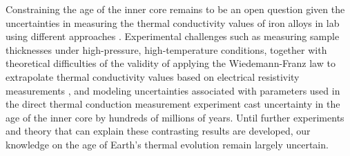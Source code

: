 \documentclass[9pt,twocolumn,twoside,lineno]{pnas-new}
\begin{document}


Constraining the age of the inner core remains to be an open question given the uncertainties in measuring the thermal conductivity values of iron alloys in lab using different approaches \cite{Konopkova2016a, Ohta2016a}. Experimental challenges such as measuring sample thicknesses under high-pressure, high-temperature conditions, together with theoretical difficulties of the validity of applying the Wiedemann-Franz law to extrapolate thermal conductivity values based on electrical resistivity measurements \cite{Ohta2016a}, and modeling uncertainties associated with parameters used in the direct thermal conduction measurement experiment  cast uncertainty in the age of the inner core by hundreds of millions of years. Until further experiments and theory that can explain these contrasting results are developed, our knowledge on the age of Earth's thermal evolution remain largely uncertain. 

\end{document}
